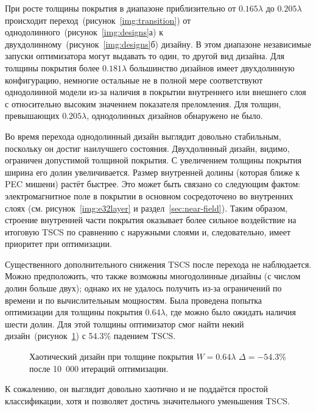 При росте толщины покрытия в диапазоне приблизительно от
${0.165\lambda}$ до ${0.205\lambda}$ происходит
переход~(рисунок~\ref{img:transition}) от
однодолинного~(рисунок~\ref{img:designs}а) к
двухдолинному~(рисунок~\ref{img:designs}б) дизайну. В этом диапазоне
независимые запуски оптимизатора могут выдавать то один, то другой вид
дизайна.  Для толщины покрытия более ${0.181\lambda}$ большинство
дизайнов имеет двухдолинную конфигурацию, немногие остальные не в
полной мере соответствуют однодолинной модели из-за наличия в покрытии
внутреннего или внешнего слоя с относительно высоким значением
показателя преломления. Для толщин, превышающих ${0.205\lambda}$,
однодолинных дизайнов обнаружено не было.

Во время перехода однодолинный дизайн выглядит довольно стабильным,
поскольку он достиг наилучшего состояния. Двухдолинный дизайн, видимо,
ограничен допустимой толщиной покрытия. С увеличением толщины покрытия
ширина его долин увеличивается. Размер внутренней долины (которая
ближе к PEC мишени) растёт быстрее. Это может быть связано со
следующим фактом: электромагнитное поле в покрытии в основном
сосредоточено во внутренних слоях (см. рисунок~\ref{img:e32layer} и
раздел~\ref{sec:near-field}). Таким образом, строение внутренней части покрытия 
оказывает более сильное воздействие на итоговую TSCS по сравнению с
наружными слоями и, следовательно, имеет приоритет при
оптимизации.

Существенного дополнительного снижения TSCS после перехода не
наблюдается. Можно предположить, что также возможны многодолинные
дизайны (с числом долин больше двух); однако их не удалось получить
из-за ограничений по времени и по вычислительным мощностям. Была
проведена попытка оптимизации для толщины покрытия $0.64\lambda$, где
можно было ожидать наличия шести долин. Для этой толщины оптимизатор
смог найти некий дизайн~(рисунок~\ref{fig:thick}) с 54.3\% падением
TSCS.
\begin{figure}
  \caption{Хаотический дизайн при толщине покрытия $W=0.64\lambda$
    $\Delta =-54.3$\% после 10~000 итераций оптимизации.
    \label{fig:thick}}%
\end{figure}
К сожалению, он выглядит довольно хаотично и не поддаётся простой
классификации, хотя и позволяет достичь значительного уменьшения
TSCS.

